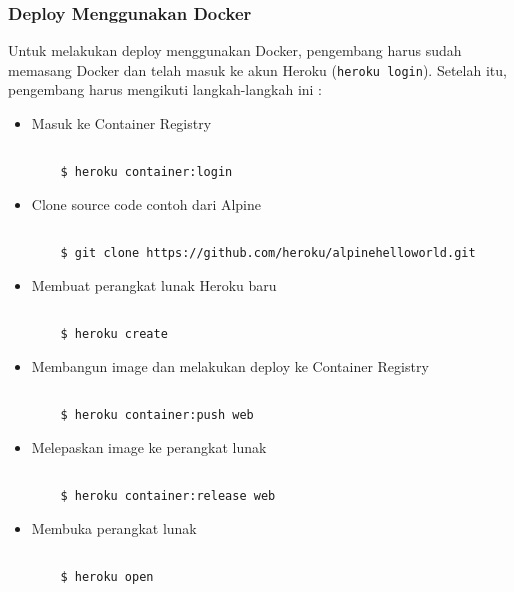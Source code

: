 \subsubsection{Deploy Menggunakan Docker}
Untuk melakukan deploy menggunakan Docker, pengembang harus sudah memasang Docker dan telah masuk ke akun Heroku (\texttt{heroku login}). Setelah itu, pengembang harus mengikuti langkah-langkah ini :
\begin{itemize}
\item Masuk ke Container Registry
\begin{lstlisting}

	$ heroku container:login

\end{lstlisting}

\item Clone source code contoh dari Alpine
\begin{lstlisting}

	$ git clone https://github.com/heroku/alpinehelloworld.git

\end{lstlisting}

\item Membuat perangkat lunak Heroku baru
\begin{lstlisting}

	$ heroku create

\end{lstlisting}

\item Membangun image dan melakukan deploy ke Container Registry
\begin{lstlisting}

	$ heroku container:push web

\end{lstlisting}

\item Melepaskan image ke perangkat lunak
\begin{lstlisting}

	$ heroku container:release web

\end{lstlisting}
\item Membuka perangkat lunak
\begin{lstlisting}

	$ heroku open

\end{lstlisting}
\end{itemize}


